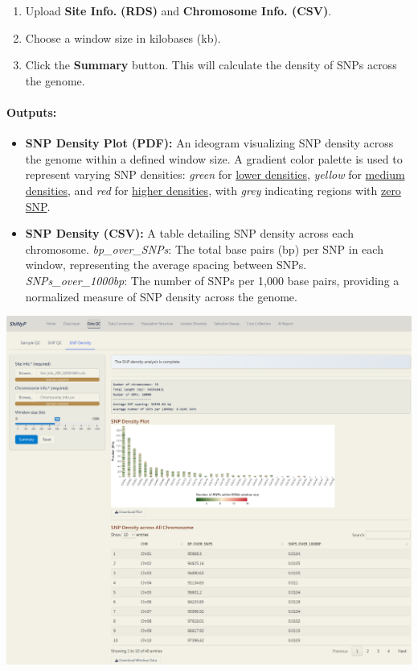 \documentclass[
]{book}
\begin{document}
\begin{enumerate}
\def\labelenumi{\arabic{enumi}.}
\item
  {Upload} \textbf{Site Info.} \textbf{(RDS)} and \textbf{Chromosome Info. (CSV)}.
\item
  Choose a window size in kilobases (kb).
\item
  Click the {\textbf{Summary}} button. This will calculate the density of SNPs across the genome.
\end{enumerate}

\paragraph*{Outputs:}\label{outputs-3}

\begin{itemize}
\item
  \textbf{SNP Density Plot (PDF):} An ideogram visualizing SNP density across the genome within a defined window size. A gradient color palette is used to represent varying SNP densities: \emph{green} for \ul{lower densities}, \emph{yellow} for \ul{medium densities}, and \emph{red} for \ul{higher densities}, with \emph{grey} indicating regions with \ul{zero SNP}.
\item
  \textbf{SNP Density (CSV):} A table detailing SNP density across each chromosome. \emph{bp\_over\_SNPs}: The total base pairs (bp) per SNP in each window, representing the average spacing between SNPs. \emph{SNPs\_over\_1000bp}: The number of SNPs per 1,000 base pairs, providing a normalized measure of SNP density across the genome.
\end{itemize}

\includegraphics[width=8.33333in,height=\textheight]{images/clipboard-3331950775.png}
\end{document}

